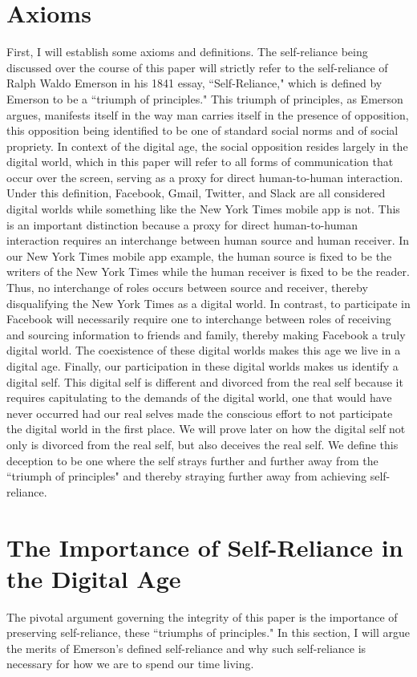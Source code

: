 \documentclass[12pt,letterpaper]{article}
\begin{document}
\section{Axioms}
First, I will establish some axioms and definitions.  The self-reliance being 
discussed over the course of this paper will strictly refer to the self-reliance of 
Ralph Waldo Emerson in his 1841 essay, ``Self-Reliance," which is defined by 
Emerson to be a ``triumph of principles."  This triumph of principles, as 
Emerson argues, manifests itself in the way man carries itself in the presence 
of opposition, this opposition being identified to be one of standard social 
norms and of social propriety.  In context of the digital age, the social opposition 
resides largely in the digital world, which in this paper will refer to all forms of 
communication that occur over the screen, serving as a proxy for direct 
human-to-human interaction.  Under this definition, Facebook, Gmail, 
Twitter, and Slack are all considered digital worlds while something like the 
New York Times mobile app is not.  This is an important distinction because a 
proxy for direct human-to-human interaction requires an interchange between 
human source and human receiver.  In our New York Times mobile app 
example, the human source is fixed to be the writers of the New York Times 
while the human receiver is fixed to be the reader.  Thus, no interchange of 
roles occurs between source and receiver, thereby disqualifying the New York 
Times as a digital world.  In contrast, to participate in Facebook will 
necessarily require one to interchange between roles of receiving and sourcing 
information to friends and family, thereby making Facebook a truly digital 
world.  The coexistence of these digital worlds makes this age we live in a 
digital age.  Finally, our participation in these digital worlds makes us identify a digital self.  This digital self is different and divorced from the real self because it requires capitulating to the demands of the digital world, one that would have never occurred had our real selves made the conscious effort to not participate the digital world in the first place.  We will prove later on how the digital self not only is divorced from the real self, but also deceives the real self.  We define this deception to be one where the self strays further and further away from the ``triumph of principles" and thereby straying further away from achieving self-reliance.

\section{The Importance of Self-Reliance in the Digital Age}
The pivotal argument governing the integrity of this paper is the importance of preserving self-reliance, these ``triumphs of principles."  In this section, I will argue the merits of Emerson's defined self-reliance and why such self-reliance is necessary for how we are to spend our time living.
\end{document}
